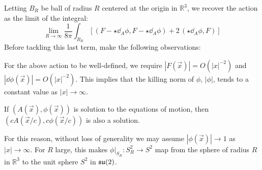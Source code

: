	
	Letting $B_R$ be ball of radius $R$ centered at the origin in $\mathbb R^3$, we recover the action as the limit of the integral:
	\begin{equation*}
		\lim_{R \to \infty} \frac{1}{8\pi} \int_{B_R} \left[ (F - \star \dd_A \phi, F - \star \dd_A \phi) + 2\, (\star \dd_A \phi, F) \right]
	\end{equation*}
	Before tackling this last term, make the following observations:
	\begin{obs}
		For the above action to be well-defined, we require $|F(\vec x)| = O(|x|^{-2})$ and $|\dd \phi(\vec x) |= O(|x|^{-2})$. This implies that the killing norm of $\phi$, $|\phi|$, tends to a constant value as $|x| \to \infty$.
	\end{obs}
	\begin{obs}
		If $(A(\vec x), \phi(\vec x))$ is solution to the equations of motion, then $(c A(\vec x/c), c \phi(\vec x/c))$ is also a solution.  
	\end{obs}
	For this reason, without loss of generality we may assume $|\phi(\vec x)| \to 1$ as $|x| \to \infty$. For $R$ large, this makes $\phi|_{S_R}: S^2_R \to S^2$ map from the sphere of radius $R$ in $\mathbb R^3$ to the unit sphere $S^2$ in $\frak{su}(2)$. 
	
